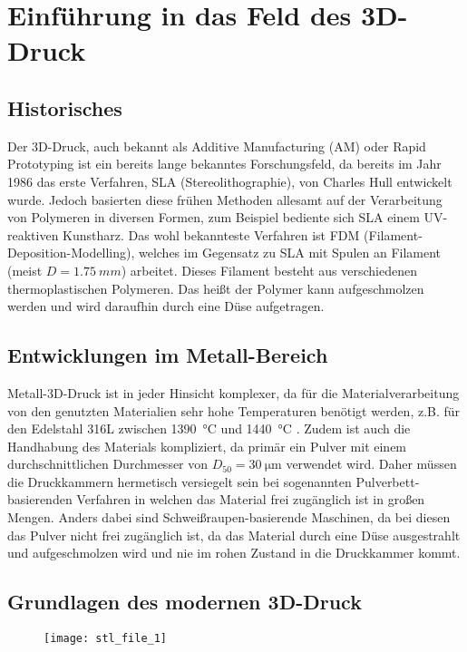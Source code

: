 \documentclass[../main.tex]{subfiles}
\begin{document}
\section{Einführung in das Feld des 3D-Druck}
\subsection{Historisches}
Der 3D-Druck, auch bekannt als Additive Manufacturing (AM) oder Rapid Prototyping ist ein bereits lange bekanntes Forschungsfeld, da bereits im Jahr 1986 das erste Verfahren, SLA (Stereolithographie), von Charles Hull entwickelt wurde. 
Jedoch basierten diese frühen Methoden allesamt auf der Verarbeitung von Polymeren in diversen Formen, zum Beispiel bediente sich SLA einem UV-reaktiven Kunstharz. 
Das wohl bekannteste Verfahren ist FDM (Filament-Deposition-Modelling), welches im Gegensatz zu SLA mit Spulen an Filament (meist $D=\qty{1.75}{mm}$) arbeitet. 
Dieses Filament besteht aus verschiedenen thermoplastischen Polymeren. Das heißt der Polymer kann aufgeschmolzen werden und wird daraufhin durch eine Düse aufgetragen.

\subsection{Entwicklungen im Metall-Bereich}
Metall-3D-Druck ist in jeder Hinsicht komplexer, da für die Materialverarbeitung von den genutzten Materialien sehr hohe Temperaturen benötigt werden, z.B. für den Edelstahl 316L zwischen \qty{1390}{\celsius} und \qty{1440}{\degreeCelsius} \parencite{610LSTEEL}. Zudem ist auch die Handhabung des Materials kompliziert, da primär ein Pulver mit einem durchschnittlichen Durchmesser von $D_{50}=\SI{30}{\micro\meter}$\parencite[~S.3]{ZAKRZEWSKI2020115} verwendet wird. 
Daher müssen die Druckkammern hermetisch versiegelt sein bei sogenannten Pulverbett-basierenden Verfahren in welchen das Material frei zugänglich ist in großen Mengen.
Anders dabei sind Schweißraupen-basierende Maschinen, da bei diesen das Pulver nicht frei zugänglich ist, da das Material durch eine Düse ausgestrahlt und aufgeschmolzen wird und nie im rohen Zustand in die Druckkammer kommt.

\subsection{Grundlagen des modernen 3D-Druck}
\begin{figure}[h]
\begin{center}
	\texttt{[image: stl\_file\_1]}
	\label{img:stl_1}
\end{center}
\end{figure}	
\end{document}
